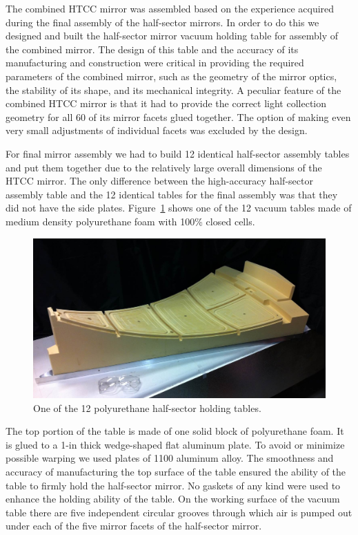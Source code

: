 The combined HTCC mirror was assembled based on the experience acquired during the final assembly of the
half-sector mirrors. In order to do this we designed and built the half-sector mirror vacuum holding table for
assembly of the combined mirror. The design of this table and the accuracy of its manufacturing and construction
were critical in providing the required parameters of the combined mirror, such as the geometry of the mirror
optics, the stability of its shape, and its mechanical integrity. A peculiar feature of the combined HTCC mirror is
that it had to provide the correct light collection geometry for all 60 of its mirror facets glued together. The
option of making even very small adjustments of individual facets was excluded by the design.
 
For final mirror assembly we had to build 12 identical half-sector assembly tables and put them together due to the
relatively large overall dimensions of the HTCC mirror. The only difference between the high-accuracy half-sector
assembly table and the 12 identical tables for the final assembly was that they did not have the side plates.
Figure~\ref{fig:One_Foam_Vacuum_Table} shows one of the 12 vacuum tables made of medium density
polyurethane foam with 100\% closed cells.
 
\begin{figure}[ht]
    \centering
    \includegraphics[width=1.0\linewidth]{images/One_Foam_Vacuum_Table.jpg}
    \caption{One of the 12 polyurethane half-sector holding tables.}
    \label{fig:One_Foam_Vacuum_Table}
\end{figure}
 
The top portion of the table is made of one solid block of polyurethane foam. It is glued to a 1-in thick wedge-shaped
flat aluminum plate. To avoid or minimize possible warping we used plates of 1100 aluminum alloy. The smoothness and
accuracy of manufacturing the top surface of the table ensured the ability of the table to firmly hold the half-sector
mirror. No gaskets of any kind were used to enhance the holding ability of the table. On the working surface of the
vacuum table there are five independent circular grooves through which air is pumped out under each of the five
mirror facets of the half-sector mirror. 

